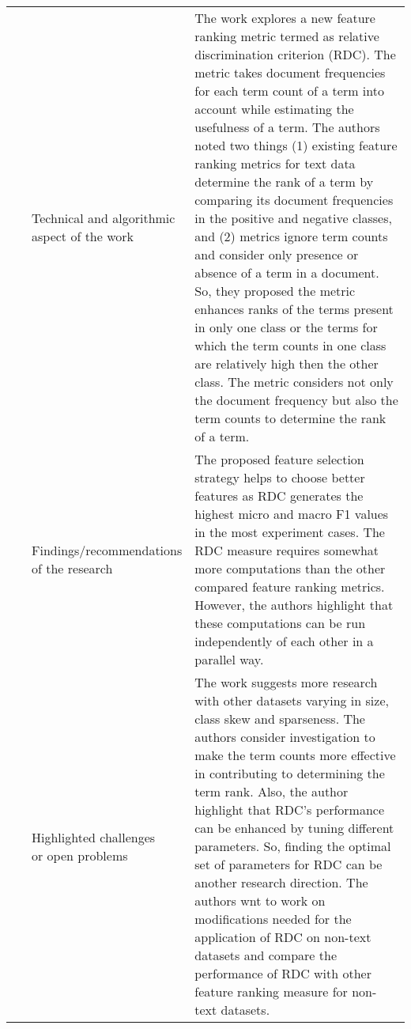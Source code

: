 \begin{landscape}
\begin{longtable}{lp{}p{}}
	\multirow{3}[0]{*}{~\citep{Rehman2015}} & 
    \specialcell{Technical and algorithmic \\ aspect of the work} &
    The work explores a new feature ranking metric termed as relative discrimination criterion (RDC). The metric takes document frequencies for each term count of a term into account while estimating the usefulness of a term. The authors noted two things (1) existing feature ranking metrics for text data determine the rank of a term by comparing its document frequencies in the positive and negative classes, and (2) metrics ignore term counts and consider only presence or absence of a term in a document. So, they proposed the metric enhances ranks of the terms present in only one class or the terms for which the term counts in one class are relatively high then the other class. The metric considers not only the document frequency but also the term counts to determine the rank of a term.    
    \\ & 
    \specialcell{Findings/recommendations \\ of the research} & 
    The proposed feature selection strategy helps to choose better features as RDC generates the highest micro and macro F1 values in the most experiment cases. The RDC measure requires somewhat more computations than the other compared feature ranking metrics. However, the authors highlight that these computations can be run independently of each other in a parallel way.
    \\ & 
    \specialcell{Highlighted challenges \\ or open problems} & 
    The work suggests more research with other datasets varying in size, class skew and sparseness. The authors consider investigation to make the term counts more effective in contributing to determining the term rank. Also, the author highlight that RDC’s performance can be enhanced by tuning different parameters. So, finding the optimal set of parameters for RDC can be another research direction. The authors wnt to work on modifications needed for the application of RDC on non-text datasets and compare the performance of RDC with other feature ranking measure for non-text datasets.
	\\
	

\end{longtable}
\end{landscape}

